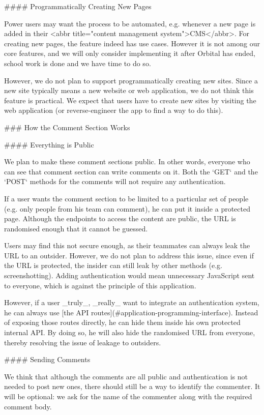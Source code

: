 \documentclass[11pt]{article}
\begin{document}
\begin{markdown}
#### Programmatically Creating New Pages

Power users may want the process to be automated, e.g. whenever a new page is added in their <abbr title="content management system">CMS</abbr>. For creating new pages, the feature indeed has use cases. However it is not among our core features, and we will only consider implementing it after Orbital has ended, school work is done and we have time to do so.

However, we do not plan to support programmatically creating new sites. Since a new site typically means a new website or web application, we do not think this feature is practical. We expect that users have to create new sites by visiting the web application (or reverse-engineer the app to find a way to do this).

### How the Comment Section Works

#### Everything is Public

We plan to make these comment sections public. In other words, everyone who can see that comment section can write comments on it. Both the `GET` and the `POST` methods for the comments will not require any authentication.

If a user wants the comment section to be limited to a particular set of people (e.g. only people from his team can comment), he can put it inside a protected page. Although the endpoints to access the content are public, the URL is randomised enough that it cannot be guessed.

Users may find this not secure enough, as their teammates can always leak the URL to an outsider. However, we do not plan to address this issue, since even if the URL is protected, the insider can still leak by other methods (e.g. screenshotting). Adding authentication would mean unnecessary JavaScript sent to everyone, which is against the principle of this application.

However, if a user _truly_, _really_ want to integrate an authentication system, he can always use [the API routes](#application-programming-interface). Instead of exposing those routes directly, he can hide them inside his own protected internal API. By doing so, he will also hide the randomised URL from everyone, thereby resolving the issue of leakage to outsiders.

#### Sending Comments

We think that although the comments are all public and authentication is not needed to post new ones, there should still be a way to identify the commenter. It will be optional: we ask for the name of the commenter along with the required comment body.


\end{markdown}
\end{document}
